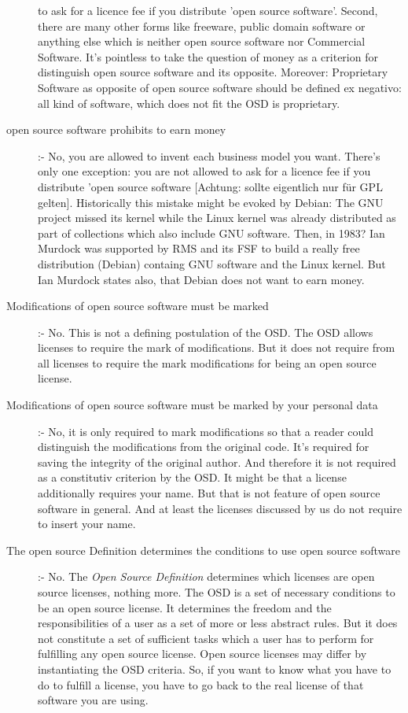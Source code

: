 \begin{description}
  to ask for a licence fee if you distribute 'open source software'. Second,
  there are many other forms like freeware, public domain software or anything
  else which is neither open source software nor Commercial Software. It's
  pointless to take the question of money as a criterion for distinguish open
  source software and its opposite. Moreover: Proprietary Software as opposite
  of open source software should be defined ex negativo: all kind of software,
  which does not fit the OSD is proprietary.
  \item[open source software prohibits to earn money] :- No,
  you are allowed to invent each business model you want. There's only one
  exception: you are not allowed to ask for a licence fee if you distribute
  'open source software [Achtung: sollte eigentlich nur für GPL gelten].
  Historically this mistake might be evoked by Debian: The GNU project missed
  its kernel while the Linux kernel was already distributed as part of
  collections which also include GNU software. Then, in 1983? Ian Murdock was
  supported by RMS and its FSF to build a really free distribution (Debian)
  containg GNU software and the Linux kernel. But Ian Murdock states also, that
  Debian does not want to earn money.
  \item[Modifications of open source software must be marked] :- No. This is not
  a defining postulation of the OSD. The OSD allows licenses to require the mark
  of modifications. But it does not require from all licenses to require the mark
  modifications for being an open source license.
  \item[Modifications of open source software must be marked by your personal
  data] :- No, it is only required to mark modifications so that a reader could
  distinguish the modifications from the original code. It's required for saving
  the integrity of the original author. And therefore it is not required as a
  constitutiv criterion by the OSD. It might be that a license additionally
  requires your name. But that is not feature of open source software in general.
  And at least the licenses discussed by us do not require to insert your name.
  \item[The open source Definition determines the conditions to use open source
  software] :- No. The \emph{Open Source Definition} determines which licenses
  are open source licenses, nothing more. The OSD is a set of necessary
  conditions to be an open source license. It determines the freedom and the
  responsibilities of a user as a set of more or less abstract rules. But it
  does not constitute a set of sufficient tasks which a user has to perform for
  fulfilling any open source license. Open source licenses may differ by
  instantiating the OSD criteria. So, if you want to know what you have to do to
  fulfill a license, you have to go back to the real license of that software
  you are using.
\end{description}

%
